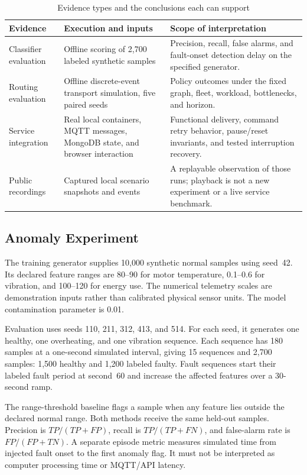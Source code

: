 \documentclass[journal]{IEEEtran}
\begin{document}
\begin{table}[t]
\centering
\caption{Evidence types and the conclusions each can support}
\label{tab:evidence}
\small
\begin{tabularx}{\textwidth}{@{}p{}p{}X@{}}
\toprule
\textbf{Evidence} & \textbf{Execution and inputs} & \textbf{Scope of interpretation}\\
\midrule
Classifier evaluation & Offline scoring of 2,700 labeled synthetic samples & Precision, recall, false alarms, and fault-onset detection delay on the specified generator.\\
Routing evaluation & Offline discrete-event transport simulation, five paired seeds & Policy outcomes under the fixed graph, fleet, workload, bottlenecks, and horizon.\\
Service integration & Real local containers, MQTT messages, MongoDB state, and browser interaction & Functional delivery, command retry behavior, pause/reset invariants, and tested interruption recovery.\\
Public recordings & Captured local scenario snapshots and events & A replayable observation of those runs; playback is not a new experiment or a live service benchmark.\\
\bottomrule
\end{tabularx}
\end{table}

\subsection{Anomaly Experiment}
The training generator supplies 10,000 synthetic normal samples using seed~42. Its declared feature ranges are 80--90 for motor temperature, 0.1--0.6 for vibration, and 100--120 for energy use. The numerical telemetry scales are demonstration inputs rather than calibrated physical sensor units. The model contamination parameter is 0.01.

Evaluation uses seeds 110, 211, 312, 413, and 514. For each seed, it generates one healthy, one overheating, and one vibration sequence. Each sequence has 180 samples at a one-second simulated interval, giving 15 sequences and 2,700 samples: 1,500 healthy and 1,200 labeled faulty. Fault sequences start their labeled fault period at second~60 and increase the affected features over a 30-second ramp.

The range-threshold baseline flags a sample when any feature lies outside the declared normal range. Both methods receive the same held-out samples. Precision is $TP/(TP+FP)$, recall is $TP/(TP+FN)$, and false-alarm rate is $FP/(FP+TN)$. A separate episode metric measures simulated time from injected fault onset to the first anomaly flag. It must not be interpreted as computer processing time or MQTT/API latency.
\end{document}
